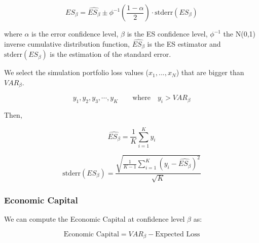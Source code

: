 \documentclass[a4paper,12pt,final]{article}
\begin{document}
\begin{displaymath}
ES_{\beta} = \widehat{ES_{\beta}} \pm \phi^{-1}\left(\frac{1-\alpha}{2}\right) \cdot \textrm{stderr}(ES_{\beta})
\end{displaymath}

where $\alpha$ is the error confidence level, $\beta$ is the ES confidence 
level, $\phi^{-1}$ the N(0,1) inverse cumulative distribution function, 
$\widehat{ES_{\beta}}$ is the ES estimator and $\textrm{stderr}(ES_{\beta})$
is the estimation of the standard error.
\newline

We select the simulation portfolio loss values ($x_1, ..., x_N$) that are bigger 
than $VAR_{\beta}$.

\begin{displaymath}
y_1, y_2, y_3, \cdots, y_K \qquad \textrm{where} \quad y_i > VAR_{\beta}
\end{displaymath}

Then,

\begin{displaymath}
\widehat{ES_{\beta}} = \frac{1}{K} \sum_{i=1}^{K} y_i
\end{displaymath}

\begin{displaymath}
\textrm{stderr}(ES_{\beta}) =
\frac{\sqrt{\frac{1}{K-1} \sum_{i=1}^{K} \left( y_i - \widehat{ES_{\beta}} \right)^2}}{\sqrt{K}}
\end{displaymath}

\subsubsection{Economic Capital}
We can compute the Economic Capital at confidence level $\beta$ as:

\begin{displaymath}
\textrm{Economic Capital} = VAR_{\beta} - \textrm{Expected Loss}
\end{displaymath}

\end{document}
